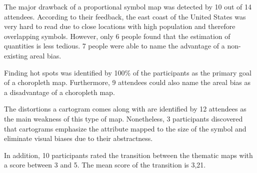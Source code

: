 The major drawback of a proportional symbol map was detected by 10 out of 14 attendees. According to their feedback, the east coast of the United States was very hard to read due to close locations with high population and therefore overlapping symbols. However, only 6 people found that the estimation of quantities is less tedious. 7 people were able to name the advantage of a non-existing areal bias.

Finding hot spots was identified by 100\% of the participants as the primary goal of a choropleth map. Furthermore, 9 attendees could also name the areal bias as a disadvantage of a choropleth map.

The distortions a cartogram comes along with are identified by 12 attendees as the main weakness of this type of map. Nonetheless, 3 participants discovered that cartograms emphasize the attribute mapped to the size of the symbol and eliminate visual biases due to their abstractness.

In addition, 10 participants rated the transition between the thematic maps with a score between 3 and 5. The mean score of the transition is 3,21.